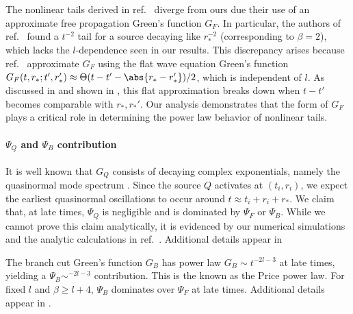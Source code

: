 The nonlinear tails derived in ref.~\cite{Okuzumi:2008ej,Lagos:2022otp} diverge from ours due their use of an approximate free propagation Green's function $G_F$.
In particular, the authors of ref.~\cite{Okuzumi:2008ej,Lagos:2022otp} found a $t^{-2}$ tail for a source decaying like $r_*^{-2}$ (corresponding to $\beta = 2$), which lacks the $l$-dependence seen in our results.
This discrepancy arises because ref.~\cite{Okuzumi:2008ej,Lagos:2022otp} approximate $G_F$ using the flat wave equation Green's function $G_F(t,r_*;t',r_*') \approx \Theta(t - t' - \abs{r_*-r_*'}) / 2$, which is independent of $l$.
As discussed in  and shown in , this flat approximation breaks down when $t-t'$ becomes comparable with $r_*, r_*'$.
Our analysis demonstrates that the form of $G_F$ plays a critical role in determining the power law behavior of nonlinear tails.



\paragraph{$\Psi_Q$ and $\Psi_B$ contribution}
It is well known that $G_Q$ consists of decaying complex exponentials, namely the quasinormal mode spectrum \cite{Leaver:1986gd}.
Since the source $Q$ activates at $(t_i,r_i)$, we expect the earliest quasinormal oscillations to occur around $t \approx t_i + r_i + r_*$.
We claim that, at late times, $\Psi_Q$ is negligible and is dominated by $\Psi_F$ or $\Psi_B$.
While we cannot prove this claim analytically, it is evidenced by our numerical simulations and the analytic calculations in ref.~\cite{Barack:1998bw}.
Additional details appear in 

The branch cut Green's function $G_B$ has power law $G_B \sim t^{-2l-3}$ at late times, yielding a $\Psi_B \sim ^{-2l-3}$ contribution.
This is the known as the Price power law.
For fixed $l$ and $\beta \geq l+4$, $\Psi_B$ dominates over $\Psi_F$ at late times.
Additional details appear in .



